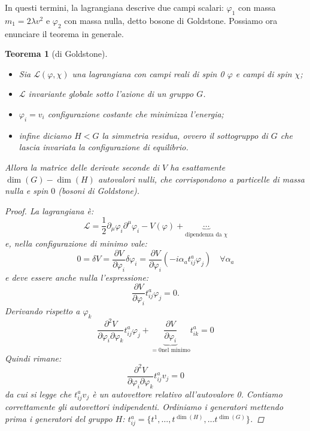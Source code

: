 \documentclass[italian,a4paper]{article}
\newtheorem*{theorem}{Teorema}
\theoremstyle{definition}
\newcommand{\lagr}{\ensuremath{\mathscr{L}}}
\begin{document}
In questi termini, la lagrangiana descrive due campi scalari: $\varphi_1$ con massa
$m_1 = 2\lambda v^2$ e $\varphi_2$ con massa nulla, detto bosone di
Goldstone. Possiamo ora enunciare il teorema in generale.
\begin{theorem}[di Goldstone]
    \label{teorema_goldstone}
    \hspace*{\fill}
    \begin{itemize}
        \item Sia $\lagr(\varphi, \chi)$ una lagrangiana con campi reali di spin 0
    $\varphi$ e campi di spin  $\chi$;
        \item $\lagr$ invariante globale sotto l'azione di un gruppo $G$.
        \item $\varphi_i = v_i$ configurazione costante che minimizza
            l'energia;
        \item infine diciamo $H < G$ la simmetria residua, ovvero il
            sottogruppo di $G$ che lascia invariata la configurazione di
            equilibrio.
    \end{itemize}
    Allora la matrice delle derivate seconde di $V$ ha esattamente
    $\dim(G) - \dim(H)$ autovalori nulli, che corrispondono a particelle di
    massa nulla e spin $0$ (bosoni di Goldstone).
    \begin{proof}
        La lagrangiana \`e:
        \begin{equation*}
            \lagr = \dfrac{1}{2}\partial_\mu \varphi_i\partial^\mu
            \varphi_i- V(\varphi) + \underbrace{\cdots}_{\text{dipendenza da
            } \chi}
        \end{equation*}
        e, nella configurazione di minimo vale:
        \begin{equation*}
            0 = \delta V = \dfrac{\partial V}{\partial \varphi_i}\delta \varphi_i = 
            \dfrac{\partial V}{\partial \varphi_i}(-i \alpha_a
            t^a_{ij}\varphi_j) \quad \forall \alpha_a
        \end{equation*}
        e deve essere anche nulla l'espressione:
        \begin{equation*}
             \dfrac{\partial V}{\partial \varphi_i}t^a_{ij}\varphi_j = 0.
        \end{equation*}
        Derivando rispetto a $\varphi_k$
        \begin{equation*}
            \dfrac{\partial^2 V}{\partial\varphi_i
            \partial\varphi_k}t^a_{ij}\varphi_j +
            \underbrace{\dfrac{\partial V}{\partial \varphi_i}}_{=0\text{
            nel minimo}}t^a_{ik} = 0
        \end{equation*}
        Quindi rimane:
        \begin{equation*}
            \dfrac{\partial^2 V}{\partial\varphi_i
            \partial\varphi_k}t^a_{ij}v_j = 0 
        \end{equation*}
        da cui si legge che $t^a_{ij}v_j$ \`e un autovettore relativo
        all'autovalore 0. Contiamo correttamente gli autovettori indipendenti. Ordiniamo i generatori mettendo prima i
        generatori del gruppo $H$: $t^a_{ij} = \{t^1,\ldots,t^{\dim(H)},
        \ldots t^{\dim(G)} \}$.


\end{proof}
\end{theorem}
\end{document}
